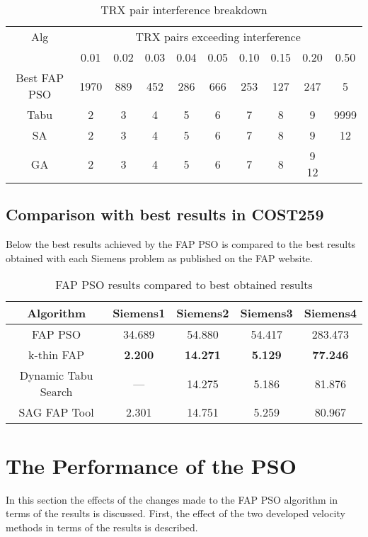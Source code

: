 \begin{table}[H]
\centering
	\begin{tabular}{cccccccccc}
	\toprule
    Alg & \multicolumn{9}{c}{TRX pairs exceeding interference}\\
    & 0.01 & 0.02 & 0.03 & 0.04 & 0.05 & 0.10 & 0.15 & 0.20 & 0.50 \\
    \midrule
    Best FAP PSO & 1970 & 889 & 452 & 286 & 666 & 253 & 127 & 247 & 5\\
    Tabu & 2 & 3 & 4 & 5 & 6 & 7 & 8 & 9 & 9999\\
    SA & 2 & 3 & 4 & 5 & 6 & 7 & 8 & 9 & 12\\
    GA & 2 & 3 & 4 & 5 & 6 & 7 & 8 & 9  12\\
    \bottomrule
	\end{tabular}
\caption{TRX pair interference breakdown}
\label{tab:breakdown-siem4m1}
\end{table}
\subsection{Comparison with best results in COST259}
Below the best results achieved by the FAP PSO is compared to the best results obtained with each Siemens problem as published on the FAP website\cite{FAPWeb}.
\begin{table}[H]
\centering
	\begin{tabular}{| c | c | c | c | c |}
	\hline
	Algorithm & Siemens1 & Siemens2 & Siemens3 & Siemens4 \\ \hline
	FAP PSO & 34.689 & 54.880 & 54.417 & 283.473 \\ \hline
	k-thin FAP & \textbf{2.200} & \textbf{14.271} & \textbf{5.129} & \textbf{77.246} \\ \hline
	Dynamic Tabu Search & --- & 14.275 & 5.186 & 81.876 \\ \hline
	SAG FAP Tool & 2.301 & 14.751 & 5.259 & 80.967 \\ \hline
	\end{tabular}
\caption{FAP PSO results compared to best obtained results}
\label{tab:siem4m2}
\end{table}
\section{The Performance of the PSO}
In this section the effects of the changes made to the FAP PSO algorithm in terms of the results is discussed. First, the effect of the two developed velocity methods in terms of the results is described. 

